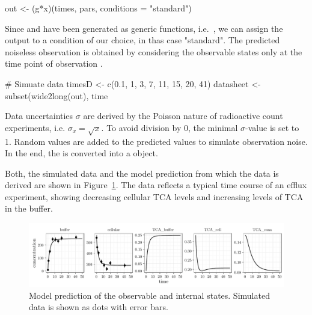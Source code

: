 \documentclass[article]{jss}
\begin{document}
\begin{CodeChunk}
\begin{CodeInput}
out <- (g*x)(times, pars, conditions = "standard")
\end{CodeInput}
\end{CodeChunk}
Since  and  have been generated as generic functions, i.e.~, we can assign the output to a condition of our choice, in thas case "standard".
The predicted noiseless observation is obtained by considering the observable states only at the time point of observation .
\begin{CodeChunk}
\begin{CodeInput}
# Simuate data
timesD <- c(0.1, 1, 3, 7, 11, 15, 20, 41)
datasheet <- subset(wide2long(out),
                    time %
\end{CodeInput}
\end{CodeChunk}

Data uncertainties $\sigma$ are derived by the Poisson nature of radioactive count experiments, i.e. $\sigma_x = \sqrt{x}$. To avoid division by 0, the minimal $\sigma$-value is set to 1. Random values are added to the predicted values to simulate observation noise. In the end, the  is converted into a  object.


\begin{CodeChunk}
\end{CodeChunk}
Both, the simulated data and the model prediction from which the data is derived are shown in Figure~\ref{fig:observation}. The data reflects a typical time course of an efflux experiment, showing decreasing cellular TCA levels and increasing levels of TCA in the buffer.
\begin{figure}[ht]
	\centering
	\includegraphics[width = \textwidth]{images/figure2}
	\caption{Model prediction of the observable and internal states. Simulated data is shown as dots with error bars.}
	\label{fig:observation}
\end{figure}
\end{document}

